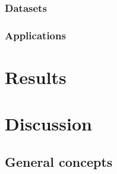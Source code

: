 \documentclass{IEEEtran}
\begin{document}

\subsubsection{Datasets} %


\subsubsection{Applications} %








\section{Results} %



\section{Discussion} %

\subsection{General concepts}




\end{document}

